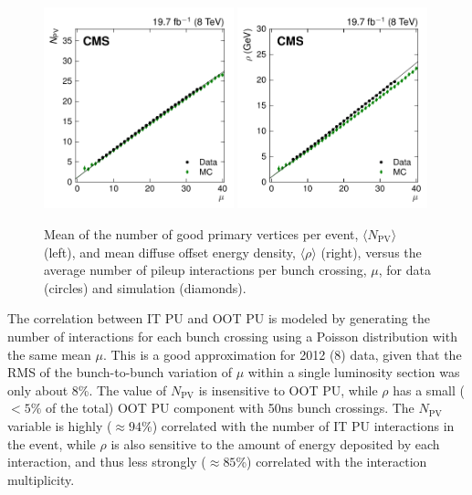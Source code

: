 \documentclass[11pt,twoside,a4paper,cmspaper,final,collab]{cms-tdr}
\begin{document}
\begin{figure}[htbp!]
\centering
\includegraphics[width=0.49\textwidth]{Figure_004-a.pdf}
\includegraphics[width=0.49\textwidth]{Figure_004-b.pdf}
\caption{\label{fig:rhovsnpv}
Mean of the number of good primary vertices per event, $\langle N_\mathrm{PV}\rangle$ (left), and mean diffuse offset energy density, $\langle\rho\rangle$ (right), versus the average number of pileup interactions per bunch crossing, $\mu$, for data (circles) and  simulation (diamonds).
}
\end{figure}

The correlation between IT PU and OOT PU is modeled by generating the number of interactions for each bunch crossing using a Poisson distribution with the same mean $\mu$. This is a good approximation for 2012 (8\TeV) data, given that the RMS of the bunch-to-bunch variation of $\mu$ within a single luminosity section was only about 8\%.
The value of $N_\mathrm{PV}$ is insensitive to OOT PU, while $\rho$ has a small (${<}5\%$ of the total) OOT PU component with 50\unit{ns} bunch crossings.
The $N_\mathrm{PV}$ variable is highly (${\approx} 94$\%) correlated with the number of IT PU interactions in the event, while $\rho$ is also sensitive to the amount of energy deposited by each interaction, and thus less strongly (${\approx} 85$\%) correlated with the interaction multiplicity.
\end{document}
